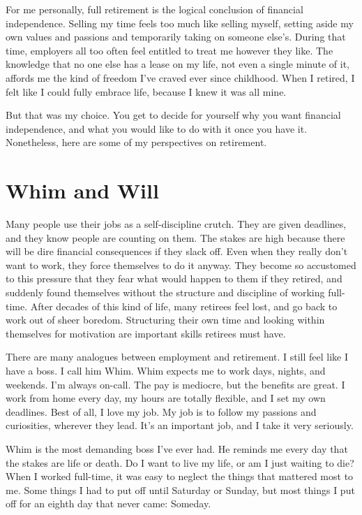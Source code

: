 For me personally, full retirement is the logical conclusion of financial independence. Selling my time feels too much like selling myself, setting aside my own values and passions and temporarily taking on someone else's. During that time, employers all too often feel entitled to treat me however they like. The knowledge that no one else has a lease on my life, not even a single minute of it, affords me the kind of freedom I've craved ever since childhood. When I retired, I felt like I could fully embrace life, because I knew it was all mine.

But that was my choice. You get to decide for yourself why you want financial independence, and what you would like to do with it once you have it. Nonetheless, here are some of my perspectives on retirement.

\section{Whim and Will}
Many people use their jobs as a self-discipline crutch. They are given deadlines, and they know people are counting on them. The stakes are high because there will be dire financial consequences if they slack off. Even when they really don't want to work, they force themselves to do it anyway. They become so accustomed to this pressure that they fear what would happen to them if they retired, and suddenly found themselves without the structure and discipline of working full-time. After decades of this kind of life, many retirees feel lost, and go back to work out of sheer boredom. Structuring their own time and looking within themselves for motivation are important skills retirees must have.

There are many analogues between employment and retirement. I still feel like I have a boss. I call him Whim. Whim expects me to work days, nights, and weekends. I'm always on-call. The pay is mediocre, but the benefits are great. I work from home every day, my hours are totally flexible, and I set my own deadlines. Best of all, I love my job. My job is to follow my passions and curiosities, wherever they lead. It's an important job, and I take it very seriously.

Whim is the most demanding boss I've ever had. He reminds me every day that the stakes are life or death. Do I want to live my life, or am I just waiting to die? When I worked full-time, it was easy to neglect the things that mattered most to me. Some things I had to put off until Saturday or Sunday, but most things I put off for an eighth day that never came: Someday.

